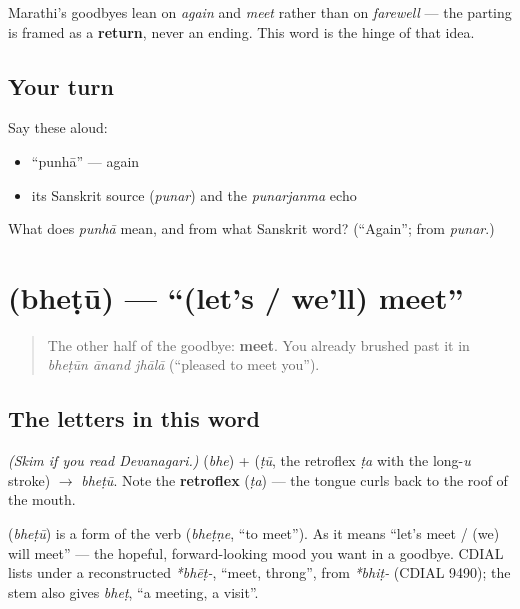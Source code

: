 \begin{culture}
Marathi's goodbyes lean on \emph{again} and \emph{meet} rather than on \emph{farewell} — the parting is framed as a \textbf{return}, never an ending. This word is the hinge of that idea.
\end{culture}

\subsection*{Your turn}
Say these aloud:

\begin{itemize}
\raggedright
  \item \textquotedblleft{}punhā\textquotedblright{} — again
  \item its Sanskrit source (\emph{punar}) and the \emph{punarjanma} echo
\end{itemize}

\begin{tcolorbox}[breakable,colback=teal!4,colframe=teal!35!black,title={Before you move on}]
What does \emph{punhā} mean, and from what Sanskrit word? (\textquotedblleft{}Again\textquotedblright{}; from \emph{punar}.)
\end{tcolorbox}
\section[\texorpdfstring{\mr{भेटू} (bheṭū)}{भेटू (bheṭū)}]{ (bheṭū) — \textquotedblleft{}(let's / we'll) meet\textquotedblright{}}

\label{lesson:MR-C04-bhetu}



\begin{quote}
The other half of the goodbye: \textbf{meet}. You already brushed past it in \emph{bheṭūn ānand jhālā} (\textquotedblleft{}pleased to meet you\textquotedblright{}).
\end{quote}

\subsection*{The letters in this word}
\emph{(Skim if you read Devanagari.)} \textbf{} (\emph{bhe}) + \textbf{} (\emph{ṭū}, the retroflex  \emph{ṭa} with the long-\emph{u} stroke) $\to$ \textbf{} \emph{bheṭū}. Note the \textbf{retroflex } (\emph{ṭa}) — the tongue curls back to the roof of the mouth.

\begin{cousinweb}
\textbf{} (\emph{bheṭū}) is a form of the verb \textbf{} (\emph{bheṭṇe}, \textquotedblleft{}to meet\textquotedblright{}). As \textbf{} it means \textquotedblleft{}let's meet / (we) will meet\textquotedblright{} — the hopeful, forward-looking mood you want in a goodbye. CDIAL lists \textbf{} under a reconstructed \emph{*bhēṭ-}, \textquotedblleft{}meet, throng\textquotedblright{}, from \emph{*bhiṭ-} (CDIAL 9490); the stem also gives \emph{bheṭ}, \textquotedblleft{}a meeting, a visit\textquotedblright{}.
\end{cousinweb}

